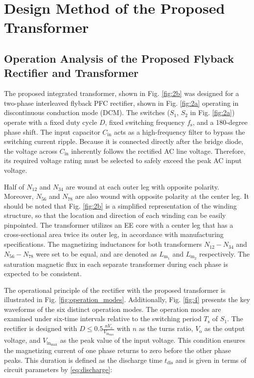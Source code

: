 \documentclass[lettersize,journal]{IEEEtran}
\begin{document}
\section{Design Method of the Proposed Transformer}
\subsection{Operation Analysis of the Proposed Flyback Rectifier and Transformer}
The proposed integrated transformer, shown in Fig. \ref{fig:2b} was designed for a two-phase interleaved flyback PFC rectifier, shown in Fig. \ref{fig:2a} operating in discontinuous conduction mode (DCM). The switches ($S_1$, $S_2$ in Fig. \ref{fig:2a}) operate with a fixed duty cycle $D${\color{red}, fixed switching frequency $f_\mathrm{s}$,} and a 180-degree phase shift. {\color{red}The input capacitor $C_\mathrm{in}$ acts as a high-frequency filter to bypass the switching current ripple. Because it is connected directly after the bridge diode, the voltage across $C_\mathrm{in}$ inherently follows the rectified AC line voltage. Therefore, its required voltage rating must be selected to safely exceed the peak AC input voltage.}

Half of $N_{12}$ and $N_{34}$ are wound at each outer leg with opposite polarity. Moreover, $N_{56}$ and $N_{78}$ are also wound with opposite polarity at the center leg. {\color{red} It should be noted that Fig. \ref{fig:2b} is a simplified representation of the winding structure, so that the location and direction of each winding can be easily pinpointed.} The transformer utilizes an EE core with a center leg that has a cross-sectional area twice its outer leg, in accordance with manufacturing specifications. The magnetizing inductances for both transformers $N_{12}-N_{34}$ and $N_{56}-N_{78}$ were set to be equal, and are denoted as $L_{\mathrm{m}_1}$ and $L_{\mathrm{m}_2}$ respectively. The saturation magnetic flux in each separate transformer during each phase is expected to be consistent.

The operational principle of the rectifier with the proposed transformer is illustrated in Fig. \ref{fig:operation_modes}. Additionally, Fig. \ref{fig:4} presents the key waveforms of the six distinct operation modes. {\color{red} The operation modes are examined under six-time intervals relative to the switching period $T_\mathrm{s}$ of $S_1$.} The rectifier is designed with $D \le 0.5 \frac{n V_{\mathrm{o}}}{V_{\mathrm{in}_{\mathrm{max}}}}$ with $n$ as the turns ratio, $V_{\mathrm{o}}$ as the output voltage, and $V_{\mathrm{in}_{\mathrm{max}}}$ as the peak value of the input voltage. This condition ensures the magnetizing current of one phase returns to zero before the other phase peaks. This duration is defined as the discharge time $t_{\mathrm{dis}}$ and is given in terms of circuit parameters by \eqref{eq:discharge}:
\end{document}
